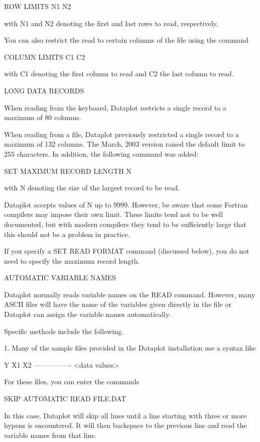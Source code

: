     ROW LIMITS  N1  N2

with N1 and N2 denoting the first and last rows to read,
respectively. 

You can also restrict the read to certain columns of the file
using the command

    COLUMN LIMITS  C1  C2

with C1 denoting the first column to read and C2 the last column
to read.


LONG DATA RECORDS

When reading from the keyboard, Dataplot restricts a single record
to a maximum of 80 columns.

When reading from a file, Dataplot previously restricted a single
record to a maximum of 132 columns.  The March, 2003 version raised
the default limit to 255 characters.  In addition, the following
command was added:

   SET MAXIMUM RECORD LENGTH  N

with N denoting the size of the largest record to be read.

Dataplot accepts values of N up to 9999.  However, be aware
that some Fortran compilers may impose their own limit.  These
limits tend not to be well documented, but with modern compilers
they tend to be sufficiently large that this should not be a
problem in practice.

If you specify a SET READ FORMAT command (discussed below), you
do not need to specify the maximum record length.


AUTOMATIC VARIABLE NAMES

Dataplot normally reads variable names on the READ command.
However, many ASCII files will have the name of the variables
given directly in the file or Dataplot can assign the variable
names automatically.

Specific methods include the following.

  1. Many of the sample files provided in the Dataplot 
     installation use a syntax like

         Y     X1   X2
        ----------------
           <data values>

     For these files, you can enter the commands

         SKIP AUTOMATIC
         READ FILE.DAT

     In this case, Dataplot will skip all lines until a line
     starting with three or more hypens is encountered.  It
     will then backspace to the previous line and read the
     variable names from that line.

